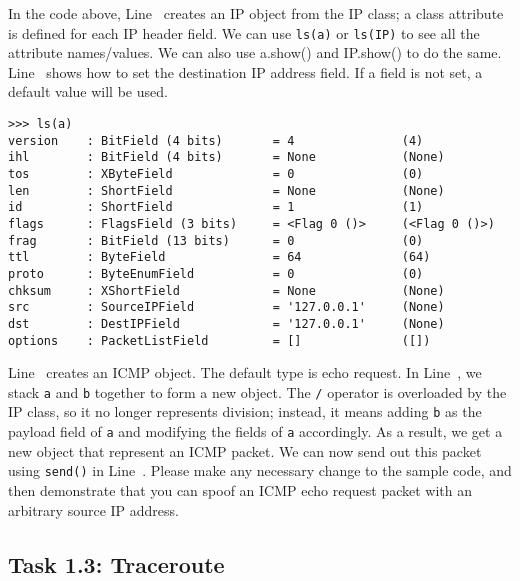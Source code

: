 In the code above, Line~ creates an IP object from the IP class; 
a class attribute is defined for each IP header field. We
can use \texttt{ls(a)} or \texttt{ls(IP)} to see all 
the attribute names/values. We can also use a.show() and IP.show() to do
the same. Line~ shows how to set the destination 
IP address field. If a field is not set, a default value will be 
used. 

\begin{lstlisting}
>>> ls(a)
version    : BitField (4 bits)       = 4               (4)
ihl        : BitField (4 bits)       = None            (None)
tos        : XByteField              = 0               (0)
len        : ShortField              = None            (None)
id         : ShortField              = 1               (1)
flags      : FlagsField (3 bits)     = <Flag 0 ()>     (<Flag 0 ()>)
frag       : BitField (13 bits)      = 0               (0)
ttl        : ByteField               = 64              (64)
proto      : ByteEnumField           = 0               (0)
chksum     : XShortField             = None            (None)
src        : SourceIPField           = '127.0.0.1'     (None)
dst        : DestIPField             = '127.0.0.1'     (None)
options    : PacketListField         = []              ([])
\end{lstlisting}
 

Line~ creates an ICMP object. The default type is echo request.
In Line~, we stack \texttt{a} and \texttt{b} together to 
form a new object. The \texttt{/} operator is overloaded by the
IP class, so it no longer represents division; instead, it means 
adding \texttt{b} as the payload field of \texttt{a} and modifying
the fields of \texttt{a} accordingly. As a result, we get a new 
object that represent an ICMP packet. We can now send out this packet 
using \texttt{send()} in Line~. Please make any necessary change
to the sample code, and then demonstrate that you can spoof an ICMP echo
request packet with an arbitrary source IP address. 



\subsection{Task 1.3: Traceroute} 

